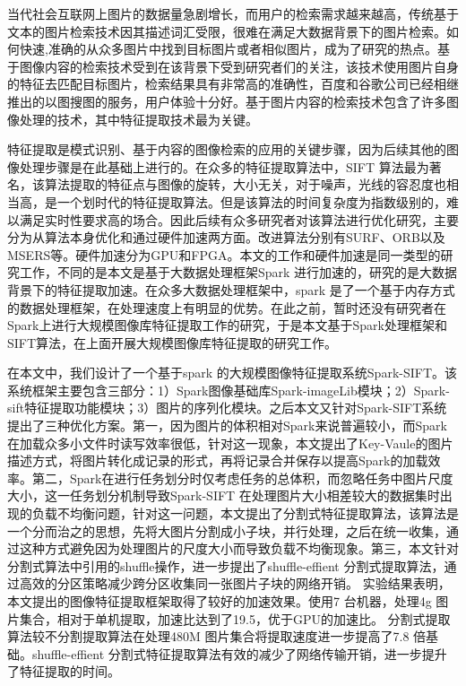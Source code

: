 ﻿\begin{cabstract}
当代社会互联网上图片的数据量急剧增长，而用户的检索需求越来越高，传统基于文本的图片检索技术因其描述词汇受限，很难在满足大数据背景下的图片检索。如何快速,准确的从众多图片中找到目标图片或者相似图片，成为了研究的热点。基于图像内容的检索技术受到在该背景下受到研究者们的关注，该技术使用图片自身的特征去匹配目标图片，检索结果具有非常高的准确性，百度和谷歌公司已经相继推出的以图搜图的服务，用户体验十分好。基于图片内容的检索技术包含了许多图像处理的技术，其中特征提取技术最为关键。

特征提取是模式识别、基于内容的图像检索的应用的关键步骤，因为后续其他的图像处理步骤是在此基础上进行的。在众多的特征提取算法中，SIFT 算法最为著名，该算法提取的特征点与图像的旋转，大小无关，对于噪声，光线的容忍度也相当高，是一个划时代的特征提取算法。但是该算法的时间复杂度为指数级别的，难以满足实时性要求高的场合。因此后续有众多研究者对该算法进行优化研究，主要分为从算法本身优化和通过硬件加速两方面。改进算法分别有SURF、ORB以及MSERS等。硬件加速分为GPU和FPGA。本文的工作和硬件加速是同一类型的研究工作，不同的是本文是基于大数据处理框架Spark 进行加速的，研究的是大数据背景下的特征提取加速。在众多大数据处理框架中，spark 是了一个基于内存方式的数据处理框架，在处理速度上有明显的优势。在此之前，暂时还没有研究者在Spark上进行大规模图像库特征提取工作的研究，于是本文基于Spark处理框架和SIFT算法，在上面开展大规模图像库特征提取的研究工作。

在本文中，我们设计了一个基于spark 的大规模图像特征提取系统Spark-SIFT。该系统框架主要包含三部分：1）Spark图像基础库Spark-imageLib模块；2）Spark-sift特征提取功能模块；3）图片的序列化模块。之后本文又针对Spark-SIFT系统提出了三种优化方案。第一，因为图片的体积相对Spark来说普遍较小，而Spark在加载众多小文件时读写效率很低，针对这一现象，本文提出了Key-Vaule的图片描述方式，将图片转化成记录的形式，再将记录合并保存以提高Spark的加载效率。第二，Spark在进行任务划分时仅考虑任务的总体积，而忽略任务中图片尺度大小，这一任务划分机制导致Spark-SIFT 在处理图片大小相差较大的数据集时出现的负载不均衡问题，针对这一问题，本文提出了分割式特征提取算法，该算法是一个分而治之的思想，先将大图片分割成小子块，并行处理，之后在统一收集，通过这种方式避免因为处理图片的尺度大小而导致负载不均衡现象。第三，本文针对分割式算法中引用的shuffle操作，进一步提出了shuffle-effient 分割式提取算法，通过高效的分区策略减少跨分区收集同一张图片子块的网络开销。 实验结果表明，本文提出的图像特征提取框架取得了较好的加速效果。使用7 台机器，处理4g 图片集合，相对于单机提取，加速比达到了19.5，优于GPU的加速比。 分割式提取算法较不分割提取算法在处理480M 图片集合将提取速度进一步提高了7.8 倍基础。shuffle-effient 分割式特征提取算法有效的减少了网络传输开销，进一步提升了特征提取的时间。
\end{cabstract}

